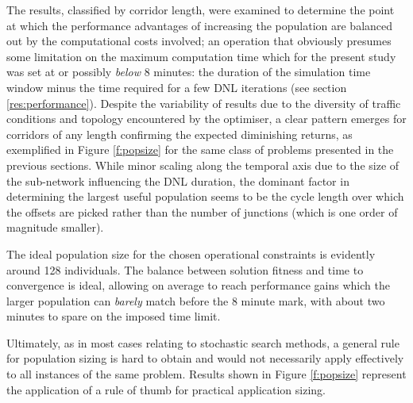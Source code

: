 The results, classified by corridor length, were examined to determine the point at which the performance advantages of increasing the population are balanced out by the computational costs involved; an operation that obviously presumes some limitation on the maximum computation time which for the present study was set at or possibly \emph{below} 8 minutes: the duration of the simulation time window minus the time required for a few DNL iterations (see section \ref{res:performance}).
Despite the variability of results due to the diversity of traffic conditions and topology encountered by the optimiser, a clear pattern emerges for corridors of any length confirming the expected diminishing returns, as exemplified in Figure \ref{f:popsize} for the same class of problems presented in the previous sections.
While minor scaling along the temporal axis due to the size of the sub-network influencing the DNL duration, the dominant factor in determining the largest useful population seems to be the cycle length over which the offsets are picked rather than the number of junctions (which is one order of magnitude smaller).

The ideal population size for the chosen operational constraints is evidently around 128 individuals. The balance between solution fitness and time to convergence is ideal, allowing on average to reach performance gains which the larger population can \emph{barely} match before the 8 minute mark, with about two minutes to spare on the imposed time limit.

Ultimately, as in most cases relating to stochastic search methods, a general rule for population sizing is hard to obtain and would not necessarily apply effectively to all instances of the same problem. Results shown in Figure \ref{f:popsize} represent the application of a rule of thumb for practical application sizing.


